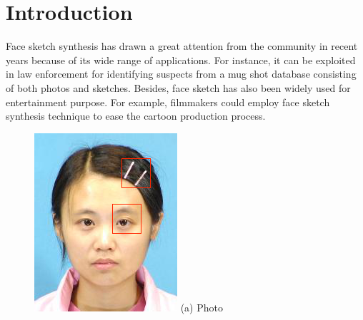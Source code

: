 \documentclass[10pt,twocolumn,letterpaper]{article}
\begin{document}
\section{Introduction}

Face sketch synthesis has drawn a great attention from the community in recent years because of its wide range of applications. For instance, it can be exploited in law enforcement for identifying suspects from a mug shot database consisting of both photos and sketches. Besides, face sketch has also been widely used for entertainment purpose. For example, filmmakers could employ face sketch synthesis technique to ease the cartoon production process.

\begin{figure}[t]
\centering
\begin{minipage}[t]{0.24\linewidth}
\centering
\includegraphics[width=1\linewidth]{img/example_photo.png}
(a) Photo
\end{minipage}
\begin{minipage}[t]{0.24\linewidth}
\centering

\end{minipage}
\end{figure}
\end{document}
